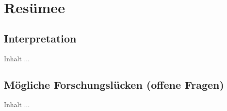 
\chapter{Res{\"u}mee}
\minitoc 


\section{Interpretation}
Inhalt ...


\section{M{\"o}gliche Forschungsl{\"u}cken (offene Fragen)}
Inhalt ...



